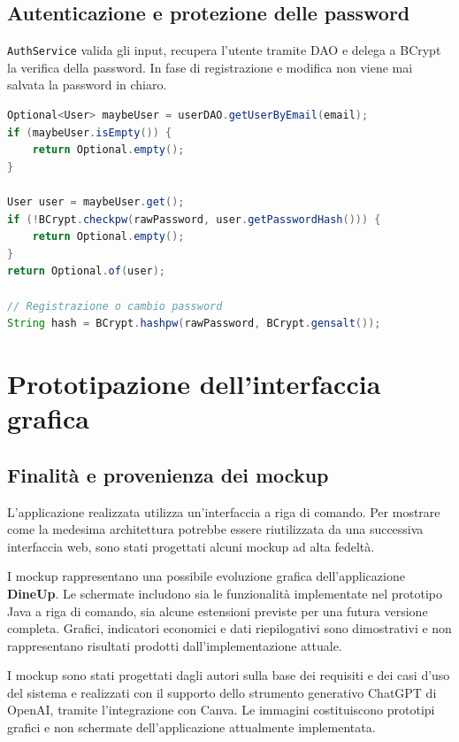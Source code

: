 \documentclass[12pt,a4paper]{article}
\newcommand{\project}{\textbf{DineUp}}
\newcommand{\code}[1]{\nolinkurl{#1}}
\begin{document}
\subsection{Autenticazione e protezione delle password}

\code{AuthService} valida gli input, recupera l'utente tramite DAO e delega a
BCrypt la verifica della password. In fase di registrazione e modifica non viene
mai salvata la password in chiaro.

\begin{lstlisting}[style=codeStyle,language=Java,
caption={Hashing e verifica delle password con BCrypt.}]
Optional<User> maybeUser = userDAO.getUserByEmail(email);
if (maybeUser.isEmpty()) {
    return Optional.empty();
}

User user = maybeUser.get();
if (!BCrypt.checkpw(rawPassword, user.getPasswordHash())) {
    return Optional.empty();
}
return Optional.of(user);

// Registrazione o cambio password
String hash = BCrypt.hashpw(rawPassword, BCrypt.gensalt());
\end{lstlisting}

\section{Prototipazione dell'interfaccia grafica}

\subsection{Finalità e provenienza dei mockup}

L'applicazione realizzata utilizza un'interfaccia a riga di comando. Per
mostrare come la medesima architettura potrebbe essere riutilizzata da una
successiva interfaccia web, sono stati progettati alcuni mockup ad alta
fedeltà.

I mockup rappresentano una possibile evoluzione grafica dell'applicazione
\project{}. Le schermate includono sia le funzionalità implementate nel
prototipo Java a riga di comando, sia alcune estensioni previste per una futura
versione completa. Grafici, indicatori economici e dati riepilogativi sono
dimostrativi e non rappresentano risultati prodotti dall'implementazione
attuale.

I mockup sono stati progettati dagli autori sulla base dei requisiti e dei casi
d'uso del sistema e realizzati con il supporto dello strumento generativo
ChatGPT di OpenAI, tramite l'integrazione con Canva. Le immagini costituiscono
prototipi grafici e non schermate dell'applicazione attualmente implementata.
\end{document}
